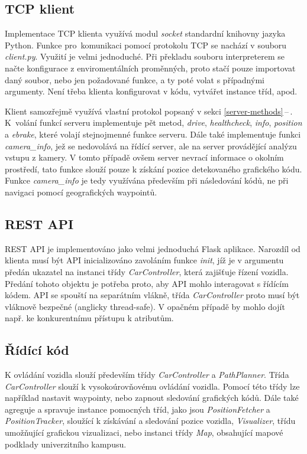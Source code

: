 \documentclass[czech, bachelor]{diploma}
\newcommand{\peteref}[1]{\ref{#1}\,--\,\nameref{#1}}
\begin{document}
\subsection{TCP klient}

Implementace TCP klienta využívá modul \emph{socket} standardní knihovny jazyka Python. Funkce pro~komunikaci pomocí protokolu TCP
se nachází v souboru \emph{client.py}. Využití je velmi jednoduché. Při překladu souboru interpreterem se načte konfigurace
z enviromentálních proměnných, proto stačí pouze importovat daný soubor, nebo jen požadované funkce, a ty poté volat s případnými
argumenty. Není třeba klienta konfigurovat v kódu, vytvářet instance tříd, apod.

Klient samozřejmě využívá vlastní protokol popsaný v sekci \peteref{server-methods}. K~volání funkcí serveru implementuje pět
metod, \emph{drive}, \emph{healthcheck}, \emph{info}, \emph{position} a \emph{ebrake}, které volají stejnojmenné funkce serveru.
Dále také implementuje funkci \emph{camera\_info}, jež se nedovolává na řídící server, ale na server provádějící analýzu vstupu
z kamery. V tomto případě ovšem server nevrací informace o okolním prostředí, tato funkce slouží pouze k získání pozice
detekovaného grafického kódu. Funkce \emph{camera\_info} je tedy využívána především při následování kódů, ne při navigaci pomocí
geografických waypointů.

\subsection{REST API}

REST API je implementováno jako velmi jednoduchá Flask \cite{flask-source} aplikace. Narozdíl od klienta musí být API
inicializováno zavoláním funkce \emph{init}, jíž je v argumentu předán ukazatel na instanci třídy \emph{CarController}, která
zajišťuje řízení vozidla. Předání tohoto objektu je potřeba proto, aby API mohlo interagovat s řídícím kódem. API se spouští
na separátním vlákně, třída \emph{CarController} proto musí být vláknově bezpečné (anglicky thread-safe). V opačném případě
by mohlo dojít např. ke konkurentnímu přístupu k atributům.

\subsection{Řídící kód}

K ovládání vozidla slouží především třídy \emph{CarController} a \emph{PathPlanner}. Třída \emph{CarController} slouží
k vysokoúrovňovému ovládání vozidla. Pomocí této třídy lze například nastavit waypointy, nebo zapnout sledování grafických kódů.
Dále také agreguje a spravuje instance pomocných tříd, jako jsou \emph{PositionFetcher} a \emph{PositionTracker}, sloužící
k získávání a sledování pozice vozidla, \emph{Visualizer}, třídu umožňující grafickou vizualizaci, nebo instanci třídy \emph{Map},
obsahující mapové podklady univerzitního kampusu.
\end{document}
